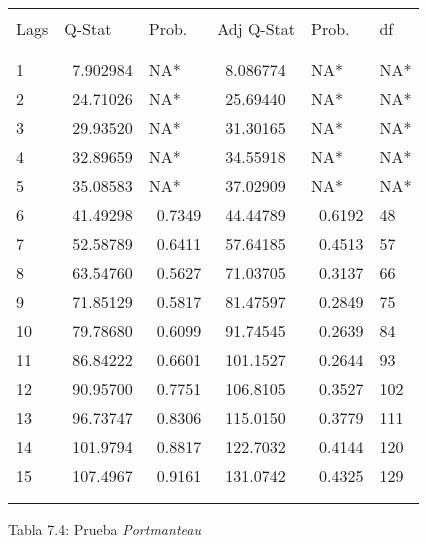 \begin{table}[H]
\begin{center}
\begin{tabular}{|p{43pt}|l|l|l|l|l|}
\hline
& 
& 
& 
& 
& 
 \\
\hline
& 
& 
& 
& 
& 
 \\
\hline
Lags& 
Q-Stat& 
Prob.& 
Adj Q-Stat& 
Prob.& 
df \\
\hline
& 
& 
& 
& 
& 
 \\
\hline
& 
& 
& 
& 
& 
 \\
\hline
1& 
~7.902984& 
NA*& 
~8.086774& 
NA*& 
NA* \\
\hline
2& 
~24.71026& 
NA*& 
~25.69440& 
NA*& 
NA* \\
\hline
3& 
~29.93520& 
NA*& 
~31.30165& 
NA*& 
NA* \\
\hline
4& 
~32.89659& 
NA*& 
~34.55918& 
NA*& 
NA* \\
\hline
5& 
~35.08583& 
NA*& 
~37.02909& 
NA*& 
NA* \\
\hline
6& 
~41.49298& 
~0.7349& 
~44.44789& 
~0.6192& 
48 \\
\hline
7& 
~52.58789& 
~0.6411& 
~57.64185& 
~0.4513& 
57 \\
\hline
8& 
~63.54760& 
~0.5627& 
~71.03705& 
~0.3137& 
66 \\
\hline
9& 
~71.85129& 
~0.5817& 
~81.47597& 
~0.2849& 
75 \\
\hline
10& 
~79.78680& 
~0.6099& 
~91.74545& 
~0.2639& 
84 \\
\hline
11& 
~86.84222& 
~0.6601& 
~101.1527& 
~0.2644& 
93 \\
\hline
12& 
~90.95700& 
~0.7751& 
~106.8105& 
~0.3527& 
102 \\
\hline
13& 
~96.73747& 
~0.8306& 
~115.0150& 
~0.3779& 
111 \\
\hline
14& 
~101.9794& 
~0.8817& 
~122.7032& 
~0.4144& 
120 \\
\hline
15& 
~107.4967& 
~0.9161& 
~131.0742& 
~0.4325& 
129 \\
\hline
& 
& 
& 
& 
& 
 \\
\hline
& 
& 
& 
& 
& 
 \\
\hline
\end{tabular}
\label{tab12}
\end{center}
\end{table}

\begin{center}
Tabla 7.4: Prueba \textit{Portmanteau} \newline

\end{center}

